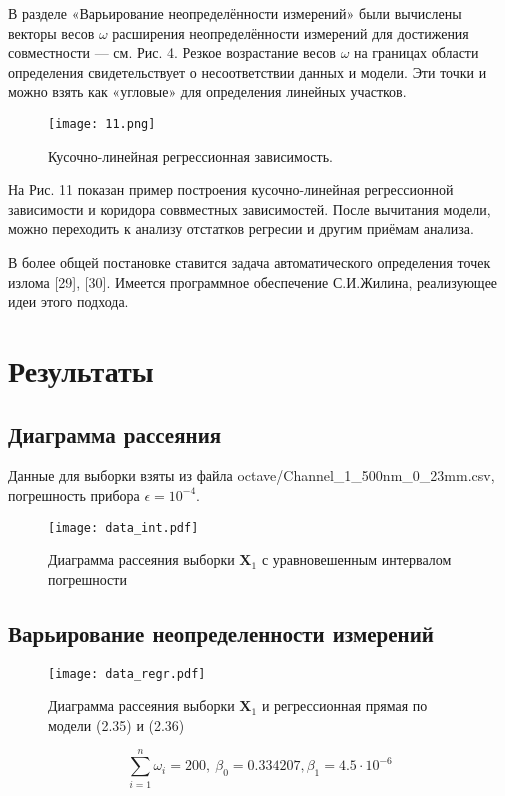 \documentclass[12pt]{article}
\begin{document}
	В разделе «Варьирование неопределённости измерений» были вычислены векторы весов $\omega$ расширения неопределённости измерений для достижения совместности — см. Рис. 4. Резкое возрастание весов $\omega$ на границах области определения свидетельствует о несоответствии данных и модели. Эти точки и можно взять как «угловые» для определения линейных участков.
	\begin{figure}[H]
		\centering
		\texttt{[image: 11.png]}
		\caption{ Кусочно-линейная регрессионная зависимость.}
		\label{fig:eleven}
	\end{figure}
	На Рис. 11 показан пример построения кусочно-линейная регрессионной зависимости и коридора соввместных зависимостей. После вычитания модели, можно переходить к анализу отстатков регресии и другим приёмам анализа.
	
	В более общей постановке ставится задача автоматического определения точек излома [29], [30]. Имеется программное обеспечение
	С.И.Жилина, реализующее идеи этого подхода.
	
	\section{Результаты}
	
	\subsection{Диаграмма рассеяния}
	
	Данные для выборки взяты из файла octave/Channel\_1\_500nm\_0\_23mm.csv, погрешность прибора $\epsilon = 10^{-4}$.
	\begin{figure}[H]
		\centering
		\texttt{[image: data\_int.pdf]}
		\caption{Диаграмма рассеяния выборки $\mathbf{X}_1$ с уравновешенным интервалом погрешности}
	\end{figure}

	\subsection{Варьирование неопределенности измерений}
	
	\begin{figure}[H]
		\centering
		\texttt{[image: data\_regr.pdf]}
		\caption{Диаграмма рассеяния выборки $\mathbf{X}_1$ и регрессионная прямая
			по модели (2.35) и (2.36)}
	\end{figure}

	\begin{equation*}
		\sum\limits_{i=1}^n \omega_i = 200,\ \beta_0 = 0.334207, \beta_1 = 4.5 \cdot 10^{-6}
	\end{equation*}
\end{document}
